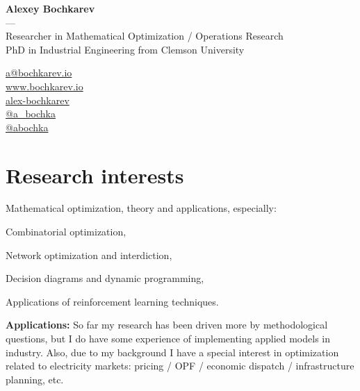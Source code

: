 \documentclass[11pt, a4paper]{article} \usepackage{geometry} %
\begin{document}
  \begin{minipage}[c]{0.74\textwidth}
    \centering
    {\LARGE \textbf{Alexey Bochkarev}}\\
    ---\\ 
    Researcher in Mathematical Optimization / Operations Research\\
    PhD in Industrial Engineering from Clemson University
  \end{minipage}\hfill%
  \begin{minipage}{0.26\textwidth}
    \faEnvelope \href{mailto:a@bochkarev.io}{a@bochkarev.io}\\
    \faGlobe \href{https://www.bochkarev.io}{www.bochkarev.io}\\
    \faGithub \href{https://github.com/alex-bochkarev}{alex-bochkarev}\\
    \faTwitter \href{https://twitter.com/a_bochka}{@a\_bochka}\\
    \faTelegram \href{https://t.me/abochka}{@abochka}
  \end{minipage}
  
  \vspace{1.0em}
  \section*{Research interests}
  Mathematical optimization, theory and applications, especially:\vspace{0.3em}
  \begin{itemize}
    \begin{minipage}{0.5\linewidth}
      \item Combinatorial optimization,
      \item Network optimization and interdiction,
    \end{minipage}
    \begin{minipage}{0.5\linewidth}
      \item Decision diagrams and dynamic programming,
      \item Applications of reinforcement learning techniques.
    \end{minipage}
  \end{itemize}

  \noindent
  \textbf{Applications:} So far my research has been driven more by
  methodological questions, but I do have some experience of
  implementing applied models in industry. Also, due to my background I have a
  special interest in optimization related to electricity markets:
  pricing / OPF / economic dispatch / infrastructure planning, etc.\vspace{1.5em}
\end{document}
